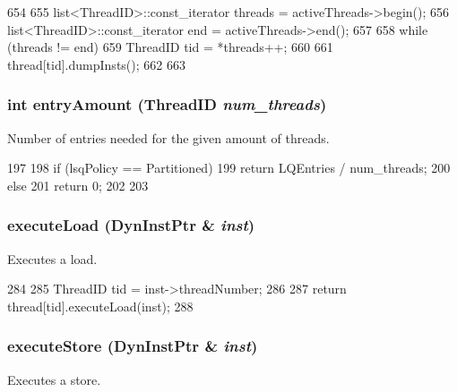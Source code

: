 \begin{DoxyCode}
654 {
655     list<ThreadID>::const_iterator threads = activeThreads->begin();
656     list<ThreadID>::const_iterator end = activeThreads->end();
657 
658     while (threads != end) {
659         ThreadID tid = *threads++;
660 
661         thread[tid].dumpInsts();
662     }
663 }
\end{DoxyCode}
\hypertarget{classLSQ_a5d2b0e4e7d98ea4ebd9fb98ac0d91e2f}{
\subsubsection[{entryAmount}]{\setlength{\rightskip}{0pt plus 5cm}int entryAmount ({\bf ThreadID} {\em num\_\-threads})}}
\label{classLSQ_a5d2b0e4e7d98ea4ebd9fb98ac0d91e2f}
Number of entries needed for the given amount of threads. 


\begin{DoxyCode}
197 {
198     if (lsqPolicy == Partitioned) {
199         return LQEntries / num_threads;
200     } else {
201         return 0;
202     }
203 }
\end{DoxyCode}
\hypertarget{classLSQ_a30c6332142c2ecca389ed6ee463c692b}{
\subsubsection[{executeLoad}]{ executeLoad ({\bf DynInstPtr} \& {\em inst})}}
\label{classLSQ_a30c6332142c2ecca389ed6ee463c692b}
Executes a load. 


\begin{DoxyCode}
284 {
285     ThreadID tid = inst->threadNumber;
286 
287     return thread[tid].executeLoad(inst);
288 }
\end{DoxyCode}
\hypertarget{classLSQ_aad78b8a37ee5c61e47df58dd39980340}{
\subsubsection[{executeStore}]{ executeStore ({\bf DynInstPtr} \& {\em inst})}}
\label{classLSQ_aad78b8a37ee5c61e47df58dd39980340}
Executes a store. 


